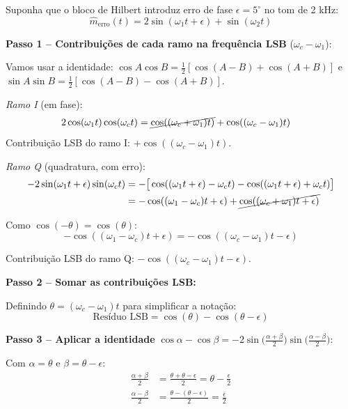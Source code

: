 \documentclass[11pt,a4paper]{article}
\begin{document}
\begin{resolucao}

Suponha que o bloco de Hilbert introduz erro de fase $\epsilon = 5^\circ$ no tom de 2 kHz:
\[
  \hat{m}_{\text{erro}}(t) = 2\sin(\omega_1 t + \epsilon) + \sin(\omega_2 t)
\]

\textbf{Passo 1 -- Contribuições de cada ramo na frequência LSB} ($\omega_c - \omega_1$):

Vamos usar a identidade: $\cos A \cos B = \frac{1}{2}[\cos(A-B) + \cos(A+B)]$ e $\sin A \sin B = \frac{1}{2}[\cos(A-B) - \cos(A+B)]$.

\textit{Ramo I} (em fase):
\begin{align*}
  2\cos(\omega_1 t)\cos(\omega_c t) &= \cancel{\cos((\omega_c + \omega_1)t)} + \cos((\omega_c - \omega_1)t)
\end{align*}
Contribuição LSB do ramo I: $+\cos((\omega_c - \omega_1)t)$.

\textit{Ramo Q} (quadratura, com erro):
\begin{align*}
  -2\sin(\omega_1 t + \epsilon)\sin(\omega_c t) &= -\big[\cos((\omega_1 t + \epsilon) - \omega_c t) - \cos((\omega_1 t + \epsilon) + \omega_c t)\big] \\
  &= -\cos((\omega_1 - \omega_c)t + \epsilon) + \cancel{\cos((\omega_c + \omega_1)t + \epsilon)}
\end{align*}

Como $\cos(-\theta) = \cos(\theta)$:
\[
  -\cos((\omega_1 - \omega_c)t + \epsilon) = -\cos((\omega_c - \omega_1)t - \epsilon)
\]

Contribuição LSB do ramo Q: $-\cos((\omega_c - \omega_1)t - \epsilon)$.

\textbf{Passo 2 -- Somar as contribuições LSB:}

Definindo $\theta = (\omega_c - \omega_1)t$ para simplificar a notação:
\[
  \text{Resíduo LSB} = \cos(\theta) - \cos(\theta - \epsilon)
\]

\textbf{Passo 3 -- Aplicar a identidade} $\cos\alpha - \cos\beta = -2\sin\!\Big(\!\frac{\alpha+\beta}{2}\!\Big)\sin\!\Big(\!\frac{\alpha-\beta}{2}\!\Big)$:

Com $\alpha = \theta$ e $\beta = \theta - \epsilon$:
\begin{align*}
  \frac{\alpha + \beta}{2} &= \frac{\theta + \theta - \epsilon}{2} = \theta - \frac{\epsilon}{2} \\[4pt]
  \frac{\alpha - \beta}{2} &= \frac{\theta - (\theta - \epsilon)}{2} = \frac{\epsilon}{2}
\end{align*}


\end{resolucao}
\end{document}
